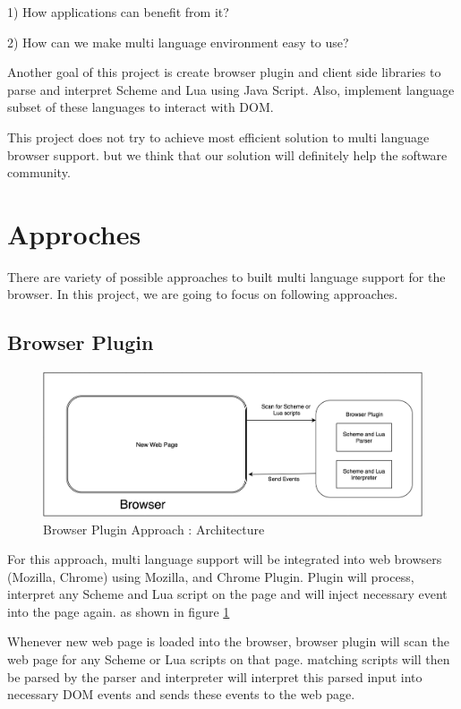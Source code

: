 1) How applications can benefit from it?

2) How can we make multi language environment easy to use?

Another goal of this project is create browser plugin and client side libraries to parse and interpret Scheme and Lua using Java Script. Also, implement language subset of these languages to interact with DOM.


This project does not try to achieve most efficient solution to multi language browser support. but we think that our solution will definitely help the software community.


\section{Approches}

There are variety of possible approaches to built multi language support for the browser. In this project, we are going to focus on following approaches. 

\subsection{Browser Plugin } 


\begin{figure}[ht]
	\begin{center}
		\includegraphics[width=\linewidth]{./images/browserPluginApproach.png}
	\end{center}
	\caption{Browser Plugin Approach : Architecture}
	\label{fig:pluginarchitecture}
\end{figure}

  For this approach, multi language support will be integrated into web browsers (Mozilla, Chrome) using Mozilla, and Chrome Plugin. Plugin will process, interpret any Scheme and Lua script on the page and will inject necessary event into the page again. as shown in figure \ref{fig:pluginarchitecture}
	 
  Whenever new web page is loaded into the browser, browser plugin will scan the web page for any Scheme or Lua scripts on that page. matching scripts will then be parsed by the parser and interpreter will interpret this parsed input into necessary DOM events and sends these events to the web page. 
  
